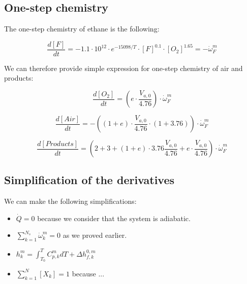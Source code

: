 \documentclass[11pt, a4paper]{article} %
\begin{document}
\subsection{One-step chemistry}

The one-step chemistry of ethane is the following:

\begin{equation}
    \frac{ d \left[ F \right] }{ dt } = - 1.1 \cdot 10^{12} \cdot e^{-15098/T} \cdot \left[ F \right]^{0.1} \cdot \left[ O_2 \right]^{1.65} = - \dot{\omega}_F^m
\end{equation}

We can therefore provide simple expression for one-step chemistry of air and products:

\begin{equation}
    \frac{ d \left[ O_2 \right] }{ dt } = \left( e \cdot \frac{V_{a,0}}{4.76} \right) \cdot \dot{\omega}_F^m
\end{equation}

\begin{equation}
    \frac{ d \left[ Air \right] }{ dt } = - \left( \left( 1 + e \right) \cdot \frac{V_{a,0}}{4.76} \cdot \left( 1 + 3.76 \right) \right) \cdot \dot{\omega}_F^m
\end{equation}

\begin{equation}
    \frac{ d \left[ Products \right] }{ dt } = \left( 2 + 3 + (1+e) \cdot 3.76 \frac{V_{a,0}}{4.76} + e \cdot \frac{V_{a,0}}{4.76} \right) \cdot \dot{\omega}_F^m
\end{equation}

\subsection{Simplification of the derivatives}


We can make the following simplifications:

\begin{itemize}

    \item $\dot{Q} = 0$ because we consider that the system is adiabatic.

    \item $\sum_{k=1}^{N_s} \dot{\omega}_k^m = 0$ as we proved earlier.

    \item $h_k^m = \int_{T_0}^{T} C^m_{p,k} dT + \Delta h_{f,k}^{0,m}$

    \item $\sum_{k=1}^{N} \left[ X_k \right] = 1$ because ...

\end{itemize}
\end{document}
